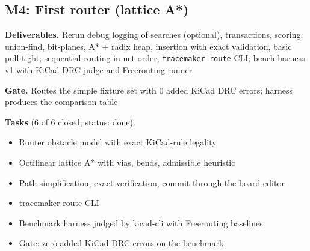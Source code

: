 \subsection*{M4: First router (lattice A*)}
\noindent\textbf{Deliverables.} Rerun debug logging of searches (optional), transactions, scoring, union-find, bit-planes, A* + radix heap, insertion with exact validation, basic pull-tight; sequential routing in net order; \texttt{tracemaker route} CLI; bench harness v1 with KiCad-DRC judge and Freerouting runner\par\smallskip
\noindent\textbf{Gate.} Routes the simple fixture set with 0 added KiCad DRC errors; harness produces the comparison table\par\smallskip
\noindent\textbf{Tasks} (6 of 6 closed; status: done).
\begin{itemize}[leftmargin=1.6em,itemsep=1pt]
\item[\textcolor{fraqua}{$\checkmark$}] Router obstacle model with exact KiCad-rule legality
\item[\textcolor{fraqua}{$\checkmark$}] Octilinear lattice A* with vias, bends, admissible heuristic
\item[\textcolor{fraqua}{$\checkmark$}] Path simplification, exact verification, commit through the board editor
\item[\textcolor{fraqua}{$\checkmark$}] tracemaker route CLI
\item[\textcolor{fraqua}{$\checkmark$}] Benchmark harness judged by kicad-cli with Freerouting baselines
\item[\textcolor{fraqua}{$\checkmark$}] Gate: zero added KiCad DRC errors on the benchmark
\end{itemize}
